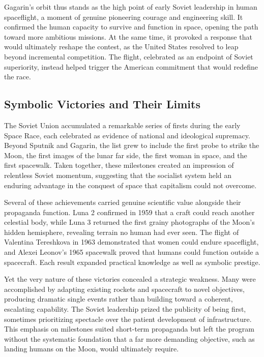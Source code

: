 Gagarin's orbit thus stands as the high point of early Soviet leadership in human spaceflight, a moment of genuine pioneering courage and engineering skill. It confirmed the human capacity to survive and function in space, opening the path toward more ambitious missions. At the same time, it provoked a response that would ultimately reshape the contest, as the United States resolved to leap beyond incremental competition. The flight, celebrated as an endpoint of Soviet superiority, instead helped trigger the American commitment that would redefine the race. \cite{siddiqi2010} \cite{harford1997}

\subsection{Symbolic Victories and Their Limits}
The Soviet Union accumulated a remarkable series of firsts during the early Space Race, each celebrated as evidence of national and ideological supremacy. Beyond Sputnik and Gagarin, the list grew to include the first probe to strike the Moon, the first images of the lunar far side, the first woman in space, and the first spacewalk. Taken together, these milestones created an impression of relentless Soviet momentum, suggesting that the socialist system held an enduring advantage in the conquest of space that capitalism could not overcome.

Several of these achievements carried genuine scientific value alongside their propaganda function. Luna 2 confirmed in 1959 that a craft could reach another celestial body, while Luna 3 returned the first grainy photographs of the Moon's hidden hemisphere, revealing terrain no human had ever seen. The flight of Valentina Tereshkova in 1963 demonstrated that women could endure spaceflight, and Alexei Leonov's 1965 spacewalk proved that humans could function outside a spacecraft. Each result expanded practical knowledge as well as symbolic prestige.

Yet the very nature of these victories concealed a strategic weakness. Many were accomplished by adapting existing rockets and spacecraft to novel objectives, producing dramatic single events rather than building toward a coherent, escalating capability. The Soviet leadership prized the publicity of being first, sometimes prioritizing spectacle over the patient development of infrastructure. This emphasis on milestones suited short-term propaganda but left the program without the systematic foundation that a far more demanding objective, such as landing humans on the Moon, would ultimately require.

